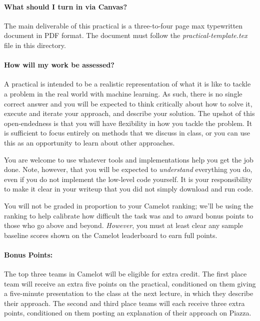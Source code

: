 \documentclass[12pt,letterpaper]{article}
\begin{document}
\paragraph{What should I turn in via Canvas?}

The main deliverable of this practical is a three-to-four page max
typewritten document in PDF format.  The document must follow the
\textit{practical-template.tex} file in this directory.

\paragraph{How will my work be assessed?}
A practical is intended to be a realistic representation of what it
is like to tackle a problem in the real world with machine learning.
As such, there is no single correct answer and you will be expected to
think critically about how to solve it, execute and iterate your
approach, and describe your solution.  The upshot of this
open-endedness is that you will have flexibility in how you tackle the
problem.  It is sufficient to focus entirely on methods that we
discuss in class, or you can use this as an opportunity to learn about
other approaches.

You are welcome to use whatever tools and implementations help you get
the job done.  Note, however, that you will be expected to
\emph{understand} everything you do, even if you do not implement the
low-level code yourself.  It is your responsibility to make it clear
in your writeup that you did not simply download and run code.


You will not be graded in proportion to your Camelot ranking; we'll be using
the ranking to help calibrate how difficult the task was and to award
bonus points to those who go above and beyond.  \textit{However}, you
must at least clear any sample baseline scores shown on the Camelot
leaderboard to earn full points.


\paragraph{Bonus Points:}
The top three teams in Camelot will be eligible for extra credit.  The
first place team will receive an extra five points on the practical,
conditioned on them giving a five-minute presentation to the class at
the next lecture, in which they describe their approach.  The second
and third place teams will each receive three extra points,
conditioned on them posting an explanation of their approach on
Piazza.
\end{document}
